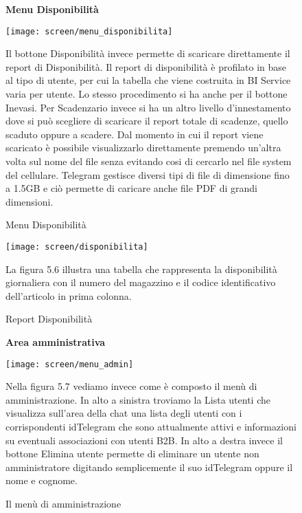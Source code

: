 \begin{figure}[h!]
\begin{center}
\textbf{Menu Disponibilità}
\end{center}
\begin{center}
    \texttt{[image: screen/menu\_disponibilita]} 
    \caption{Menu Disponibilità}
     \end{center}
    Il bottone Disponibilità invece permette di scaricare direttamente il report di Disponibilità. Il report di disponibilità è profilato in base al tipo di utente, per cui la tabella che viene costruita in BI Service varia per utente. Lo stesso procedimento si ha anche per il bottone Inevasi. Per Scadenzario invece si ha un altro livello d’innestamento dove si può scegliere di scaricare il report totale di scadenze, quello scaduto oppure a scadere. Dal momento in cui il report viene scaricato è possibile visualizzarlo direttamente premendo un’altra volta sul nome del file senza evitando cosi di cercarlo nel file system del cellulare. Telegram gestisce diversi tipi di file di dimensione fino a 1.5GB e ciò permette di caricare anche file PDF di grandi dimensioni. 
\end{figure}  


\begin{figure}[h!]
   
    \texttt{[image: screen/disponibilita]} 
    \caption{Report Disponibilità}
     La figura 5.6 illustra una tabella che rappresenta la disponibilità giornaliera con il numero del magazzino e il codice identificativo dell’articolo in prima colonna.
\end{figure}  


\begin{figure}[h!]
   \begin{center}
   \textbf{Area amministrativa}\\
   \end{center}
   \begin{center}
    \texttt{[image: screen/menu\_admin]} 
    \caption{Il menù di amministrazione}
    \end{center}
     Nella figura 5.7 vediamo invece come è composto il menù di amministrazione. In alto a sinistra troviamo la Lista utenti che visualizza sull’area della chat una lista degli utenti con i corrispondenti idTelegram che sono attualmente attivi e informazioni su eventuali associazioni con utenti B2B. In alto a destra invece il bottone Elimina utente permette di eliminare un utente non amministratore digitando semplicemente il suo idTelegram oppure il nome e cognome. 
\end{figure}  

